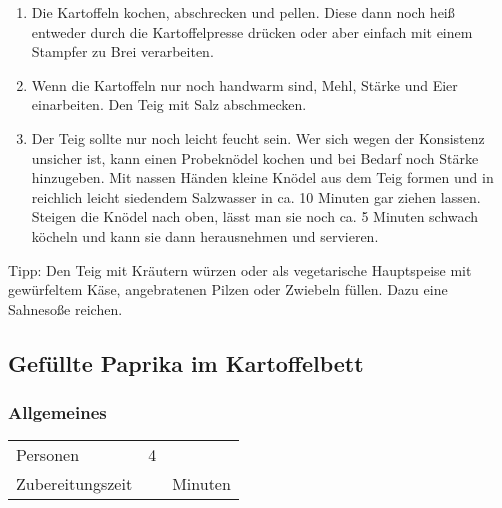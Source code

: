 \begin{enumerate}
    \item Die Kartoffeln kochen, abschrecken und pellen. Diese dann noch heiß entweder durch die Kartoffelpresse drücken oder aber einfach mit einem Stampfer zu Brei verarbeiten.
    \item Wenn die Kartoffeln nur noch handwarm sind, Mehl, Stärke und Eier einarbeiten. Den Teig mit Salz abschmecken.
    \item Der Teig sollte nur noch leicht feucht sein. Wer sich wegen der Konsistenz unsicher ist, kann einen Probeknödel kochen und bei Bedarf noch Stärke hinzugeben. Mit nassen Händen kleine Knödel aus dem Teig formen und in reichlich leicht siedendem Salzwasser in ca. 10 Minuten gar ziehen lassen. Steigen die Knödel nach oben, lässt man sie noch ca. 5 Minuten schwach köcheln und kann sie dann herausnehmen und servieren.
\end{enumerate}
Tipp: Den Teig mit Kräutern würzen oder als vegetarische Hauptspeise mit gewürfeltem Käse, angebratenen Pilzen oder Zwiebeln füllen. Dazu eine Sahnesoße reichen. 

\subsection{Gefüllte Paprika im Kartoffelbett} 

\subsubsection*{Allgemeines}
\begin{tabular}{lrl}
    Personen         &   4 &  \\
    Zubereitungszeit &   & Minuten \\
\end{tabular} 

